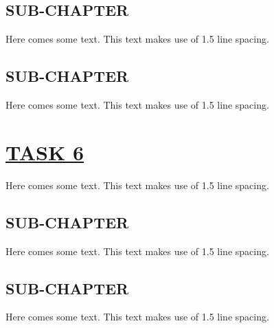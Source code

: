\documentclass[fontsize=11pt]{scrartcl}
\begin{document}
\subsection{SUB-CHAPTER}
Here comes some text. This text makes use of 1.5 line spacing. 
\subsection{SUB-CHAPTER}
Here comes some text. This text makes use of 1.5 line spacing. 
\pagebreak
\section{\uline{TASK 6}}
Here comes some text. This text makes use of 1.5 line spacing. 
\subsection{SUB-CHAPTER}
Here comes some text. This text makes use of 1.5 line spacing. 
\subsection{SUB-CHAPTER}
Here comes some text. This text makes use of 1.5 line spacing. 
\end{document}
